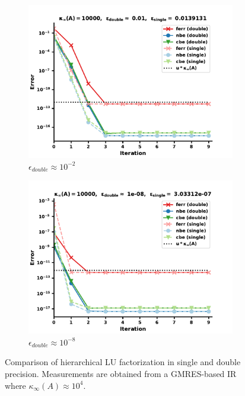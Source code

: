 \begin{figure}
\centering
\begin{subfigure}{.5\textwidth}
  \centering
  \includegraphics[width=\linewidth]{chapters/5_experiments/figures/GMRES512_e1_0s.pdf}
  \caption{$\epsilon_{double} \approx 10^{-2}$}
  \label{fig:lrirsg2_1}
\end{subfigure}%
\begin{subfigure}{.5\textwidth}
  \centering
  \includegraphics[width=\linewidth]{chapters/5_experiments/figures/GMRES512_e1_1s.pdf}
  \caption{$\epsilon_{double} \approx 10^{-8}$}
  \label{fig:lrirsg2_2}
\end{subfigure}
\caption[Mixed Precision Low-Rank GMRES-IR 2]{Comparison of hierarchical LU factorization in single and double precision. Measurements are obtained from a GMRES-based IR where $\kappa_\infty(A) \approx 10^4$.}
\label{fig:lrirsg2}
\end{figure}

